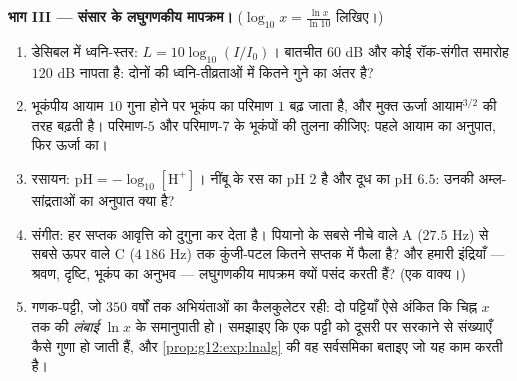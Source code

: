 \begin{problem}
\medskip
\noindent\textbf{भाग III --- संसार के लघुगणकीय मापक्रम।}
($\log_{10} x = \frac{\ln x}{\ln 10}$ लिखिए।)
\begin{enumerate}[resume]
  \item डेसिबल में ध्वनि-स्तर: $L = 10 \log_{10}(I/I_0)$। बातचीत $60$ dB और कोई रॉक-संगीत
        समारोह $120$ dB नापता है: दोनों की ध्वनि-तीव्रताओं में कितने गुने
        का अंतर है?
  \item भूकंपीय आयाम $10$ गुना होने पर भूकंप का परिमाण $1$ बढ़ जाता है,
        और मुक्त ऊर्जा आयाम$^{3/2}$ की तरह बढ़ती है। परिमाण-$5$ और
        परिमाण-$7$ के भूकंपों की तुलना कीजिए: पहले आयाम का अनुपात, फिर
        ऊर्जा का।
  \item रसायन: $\text{pH} = -\log_{10}[\mathrm{H^+}]$। नींबू के रस का pH $2$ है और दूध का pH $6.5$: उनकी
        अम्ल-सांद्रताओं का अनुपात क्या है?
  \item संगीत: हर सप्तक आवृत्ति को दुगुना कर देता है। पियानो के सबसे नीचे
        वाले A ($27.5$ Hz) से सबसे ऊपर वाले C ($4\,186$ Hz) तक कुंजी-पटल कितने
        सप्तक में फैला है? और हमारी इंद्रियाँ --- श्रवण, दृष्टि, भूकंप का
        अनुभव --- लघुगणकीय मापक्रम क्यों पसंद करती हैं? (एक वाक्य।)
  \item गणक-पट्टी, जो $350$ वर्षों तक अभियंताओं का कैलकुलेटर रही: दो
        पट्टियाँ ऐसे अंकित कि चिह्न $x$ तक की \emph{लंबाई} $\ln x$ के
        समानुपाती हो। समझाइए कि एक पट्टी को दूसरी पर सरकाने से संख्याएँ कैसे
        गुणा हो जाती हैं, और \cref{prop:g12:exp:lnalg} की वह सर्वसमिका बताइए जो यह काम करती है।
\end{enumerate}


\end{problem}

